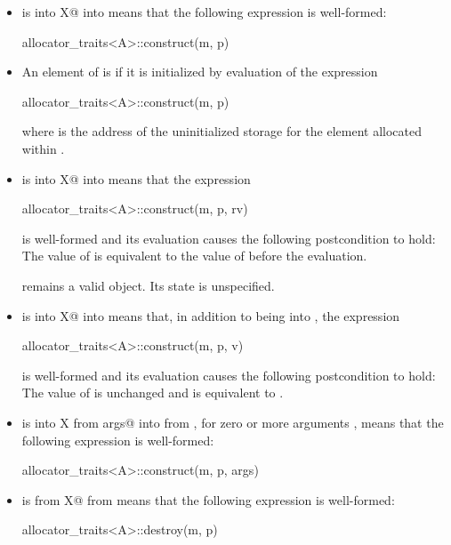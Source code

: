 \begin{itemize}
\item
{} is 
{ into X@ into }
means that the following expression is well-formed:
\begin{codeblock}
allocator_traits<A>::construct(m, p)
\end{codeblock}

\item
An element of  is  if it is initialized
by evaluation of the expression
\begin{codeblock}
allocator_traits<A>::construct(m, p)
\end{codeblock}
where  is the address of the uninitialized storage for the element
allocated within .

\item
{} is 
{ into X@ into }
means that the expression
\begin{codeblock}
allocator_traits<A>::construct(m, p, rv)
\end{codeblock}
is well-formed
and its evaluation causes the following postcondition to hold: The value
of  is equivalent to the value of  before the evaluation.
\begin{note}
 remains a valid object. Its state is unspecified.
\end{note}

\item
{} is 
{ into X@ into }
means that, in addition to  being  into
, the expression
\begin{codeblock}
allocator_traits<A>::construct(m, p, v)
\end{codeblock}
is well-formed
and its evaluation causes the following postcondition to hold:
The value of  is unchanged and is equivalent to .

\item
{} is
{ into X from args@ into  from },
for zero
or more arguments , means that the following expression is well-formed:
\begin{codeblock}
allocator_traits<A>::construct(m, p, args)
\end{codeblock}

\item
{} is
{ from X@ from }
means that the following expression is well-formed:
\begin{codeblock}
allocator_traits<A>::destroy(m, p)
\end{codeblock}
\end{itemize}

